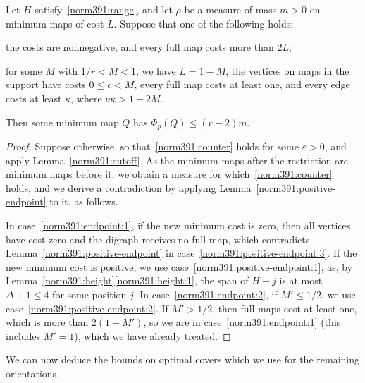 \begin{theorem}
\label{norm391:endpoint}
Let $H$ satisfy~\eqref{norm391:range}, and let $\rho$ be a measure of mass $m>0$ on
minimum maps of cost $L$. Suppose that one of the following holds:
\begin{props}
\item\label{norm391:endpoint:1} the costs are nonnegative, and every full map costs more than $2L$;
\item\label{norm391:endpoint:2} for some $M$ with $1/r<M<1$, we have $L=1-M$, the vertices on maps in the support have costs $0\le c<M$,
every full map costs at least one, and every edge costs at least $\kappa$, where
$\nu\kappa>1-2M$.
\end{props}
Then some minimum map $Q$ has $\Phi_p(Q)\le(r-2)m$.
\end{theorem}
\begin{proof}
Suppose otherwise, so that~\eqref{norm391:counter} holds for some $\varepsilon>0$, and apply Lemma~\ref{norm391:cutoff}. As the minimum maps after the restriction are minimum maps before it, we obtain a measure for which~\eqref{norm391:counter} holds, and we derive a contradiction by applying Lemma~\ref{norm391:positive-endpoint} to it, as follows.

In case~\ref{norm391:endpoint:1}, if the new minimum cost is zero, then all vertices have cost zero and the digraph receives no full map, which contradicts Lemma~\ref{norm391:positive-endpoint} in case~\ref{norm391:positive-endpoint:3}.
If the new minimum cost is positive, we use case~\ref{norm391:positive-endpoint:1}, as, by Lemma~\ref{norm391:height}\ref{norm391:height:1}, the span of $H-j$ is at most $\Delta+1\le4$ for some position $j$.
In case~\ref{norm391:endpoint:2}, if $M'\le1/2$, we use case~\ref{norm391:positive-endpoint:2}.
If $M'>1/2$, then full maps cost at least one, which is more than $2(1-M')$, so we are in case~\ref{norm391:endpoint:1} (this includes $M'=1$), which we have already treated.
\end{proof}

We can now deduce the bounds on optimal covers which we use for the remaining orientations.

